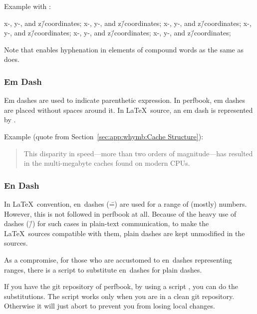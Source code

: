 Example with \qco{\\=/}:

\begin{center}\begin{minipage}{2.55in}\vspace{0.6\baselineskip}
x-, y-, and z\=/coordinates; x-, y-, and z\=/coordinates;
x-, y-, and z\=/coordinates; x-, y-, and z\=/coordinates;
x-, y-, and z\=/coordinates; x-, y-, and z\=/coordinates;
\vspace{0.6\baselineskip}\end{minipage}\end{center}

Note that \qco{\\=/} enables hyphenation in elements
of compound words as the same as \qco{\\-/} does.

\subsubsection{Em Dash}
\label{sec:app:styleguide:Em Dash}

Em dashes are used to indicate parenthetic expression. In perfbook,
em dashes are placed without spaces around it. In \LaTeX\ source,
an em dash is represented by \qco{---}.

Example (quote from Section~\ref{sec:app:whymb:Cache Structure}):
\begin{quote}
  This disparity in speed---more than two orders of magnitude---has
  resulted in the multi-megabyte caches found on modern CPUs.
\end{quote}

\subsubsection{En Dash}
\label{sec:app;styleguide:En Dash}

In \LaTeX\ convention, en~dashes (\==) are used for a range of (mostly)
numbers.
However, this is not followed in perfbook at all.
Because of the heavy use of dashes (\=/) for such cases
in plain-text communication, to make the \LaTeX\ sources compatible
with them, plain dashes are kept unmodified in the sources.

As a compromise, for those who are accustomed to en~dashes representing
ranges, there is a script to substitute en~dashes for plain dashes.

If you have the git repository of perfbook, by using a script
, you can do the substitutions.
The script works only when you are in a clean git repository.
Otherwise it will just abort to prevent you from losing local
changes.

